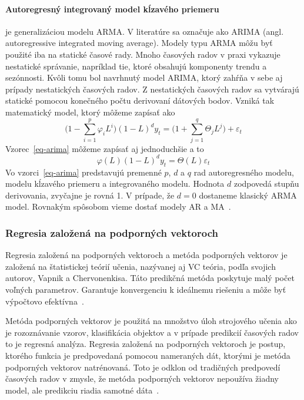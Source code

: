 \documentclass[a4paper,slovak,12pt,appendix]{article}
\begin{document}
\paragraph{Autoregresný integrovaný model kĺzavého priemeru} je
generalizáciou modelu ARMA. V literatúre sa označuje ako ARIMA (angl. autoregressive
integrated moving average). Modely typu ARMA môžu byť použité iba na statické
časové rady. Mnoho časových radov v praxi vykazuje nestatické správanie, napríklad
tie, ktoré obsahujú komponenty trendu a sezónnosti. Kvôli tomu bol navrhnutý
model ARIMA, ktorý zahŕňa v sebe aj prípady nestatických časových radov.
Z nestatických časových radov sa vytvárajú statické pomocou konečného počtu
derivovaní dátových bodov. Vzniká tak matematický model, ktorý môžeme zapísať
ako
\begin{equation}
  \Big( 1 - \sum_{i=1}^{p} \varphi_i L^i \Big) (1-L)^d y_t = \Big( 1 + \sum_{j=1}^{q} \Theta_j L^j \Big) + \varepsilon_t
  \label{eq-arima}
\end{equation}
Vzorec~\ref{eq-arima} môžeme zapísať aj jednoduchšie a to
\begin{equation}
  \varphi(L) (1-L)^d y_t = \Theta(L) \varepsilon_t
  \label{eq-arima-short}
\end{equation}
Vo vzorci~\ref{eq-arima} predstavujú premenné $p$, $d$ a $q$ rad autoregresného
modelu, modelu kĺzavého priemeru a integrovaného modelu. Hodnota $d$ zodpovedá
stupňu derivovania, zvyčajne je rovná 1. V prípade, že $d=0$ dostaneme klasický
ARMA model. Rovnakým spôsobom vieme dostať modely AR a MA~\cite{Agrawal2013}.


\subsubsection{Regresia založená na podporných vektoroch}
Regresia založená na podporných vektoroch a metóda podporných vektorov je
založená na štatistickej teórií učenia, nazývanej aj VC teória, podľa svojich
autorov, Vapnik a Chervonenkisa. Táto predikčná metóda poskytuje malý počet
voľných parametrov. Garantuje konvergenciu k ideálnemu riešeniu a môže byť
výpočtovo efektívna~\cite{Sapankevych2009}.

Metóda podporných vektorov je použitá na množstvo úloh strojového učenia ako je
rozoznávanie vzorov, klasifikácia objektov a v prípade predikcií časových
radov to je regresná analýza. Regresia založená na podporných vektoroch je
postup, ktorého funkcia je predpovedaná pomocou nameraných dát, ktorými je
metóda podporných vektorov natrénovaná. Toto je odklon od tradičných predpovedí
časových radov v zmysle, že metóda podporných vektorov nepoužíva žiadny model,
ale predikciu riadia samotné dáta~\cite{Sapankevych2009}.
\end{document}

